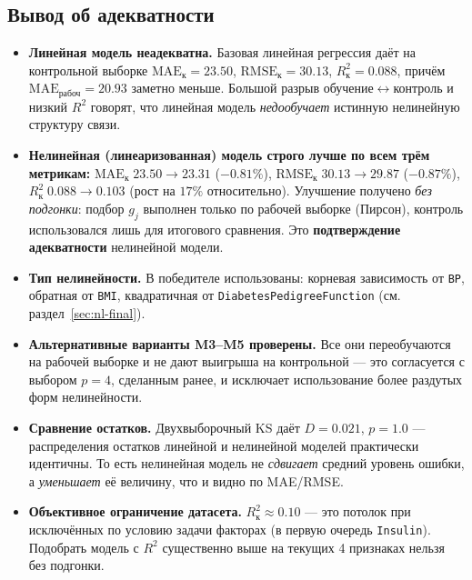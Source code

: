 \documentclass[a4paper, 14pt]{extarticle}
\begin{document}
\subsection{Вывод об адекватности}
\begin{itemize}
  \item \textbf{Линейная модель неадекватна.} Базовая линейная регрессия даёт на контрольной выборке
        $\mathrm{MAE}_{\text{к}}=23.50$, $\mathrm{RMSE}_{\text{к}}=30.13$, $R^{2}_{\text{к}}=0.088$, причём
        $\mathrm{MAE}_{\text{рабоч}}=20.93$ заметно меньше. Большой разрыв обучение$\leftrightarrow$контроль и
        низкий $R^2$ говорят, что линейная модель \emph{недообучает} истинную нелинейную структуру связи.
  \item \textbf{Нелинейная (линеаризованная) модель строго лучше по всем трём метрикам:}
        $\mathrm{MAE}_{\text{к}}\;23.50\!\to\!23.31$ ($-0.81\%$),
        $\mathrm{RMSE}_{\text{к}}\;30.13\!\to\!29.87$ ($-0.87\%$),
        $R^{2}_{\text{к}}\;0.088\!\to\!0.103$ (рост на $17\%$ относительно).
        Улучшение получено \textit{без подгонки}: подбор $g_j$ выполнен только по рабочей выборке (Пирсон),
        контроль использовался лишь для итогового сравнения. Это \textbf{подтверждение адекватности} нелинейной модели.
  \item \textbf{Тип нелинейности.} В победителе использованы: корневая зависимость от \texttt{BP},
        обратная от \texttt{BMI}, квадратичная от \texttt{DiabetesPedigreeFunction} (см. раздел~\ref{sec:nl-final}).
  \item \textbf{Альтернативные варианты M3--M5 проверены.} Все они переобучаются на рабочей выборке
        и не дают выигрыша на контрольной --- это согласуется с выбором $p=4$, сделанным ранее, и
        исключает использование более раздутых форм нелинейности.
  \item \textbf{Сравнение остатков.} Двухвыборочный KS даёт $D=0.021$, $p=1.0$ --- распределения остатков
        линейной и нелинейной моделей практически идентичны. То есть нелинейная модель не \emph{сдвигает}
        средний уровень ошибки, а \emph{уменьшает} её величину, что и видно по MAE/RMSE.
  \item \textbf{Объективное ограничение датасета.} $R^{2}_{\text{к}}\approx 0.10$ --- это потолок при исключённых
        по условию задачи факторах (в первую очередь \texttt{Insulin}). Подобрать модель с $R^{2}$ существенно
        выше на текущих 4 признаках нельзя без подгонки.
\end{itemize}
\end{document}
